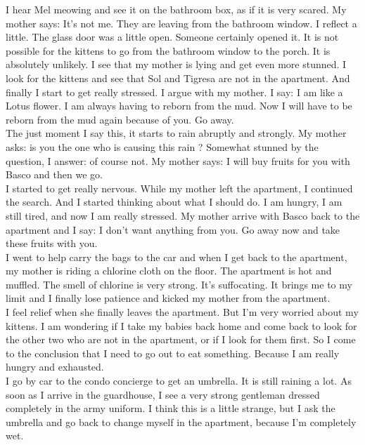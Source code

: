 \documentclass[11pt]{book}
\begin{document}
\noindent I hear Mel meowing and see it on the bathroom box, as if it is very scared. My mother says: It's not me. They are leaving from the bathroom window. I reflect a little. The glass door was a little open. Someone certainly opened it. It is not possible for the kittens to go from the bathroom window to the porch. It is absolutely unlikely. I see that my mother is lying and get even more stunned. I look for the kittens and see that Sol and Tigresa are not in the apartment. And finally I start to get really stressed. I argue with my mother. I say: I am like a Lotus flower. I am always having to reborn from the mud. Now I will have to be reborn from the mud again because of you. Go away. \\

\noindent The just moment I say this, it starts to rain abruptly and strongly. My mother asks: is you the one who is causing this rain ? Somewhat stunned by the question, I answer: of course not. My mother says: I will buy fruits for you with Basco and then we go. \\

\noindent I started to get really nervous. While my mother left the apartment, I continued the search. And I started thinking about what I should do. I am hungry, I am still tired, and now I am really stressed. My mother arrive with Basco back to the apartment and I say: I don't want anything from you. Go away now and take these fruits with you. \\

\noindent I went to help carry the bags to the car and when I get back to the apartment, my mother is riding a chlorine cloth on the floor. The apartment is hot and muffled. The smell of chlorine is very strong. It's suffocating. It brings me to my limit and I finally lose patience and kicked my mother from the apartment. \\

\noindent I feel relief when she finally leaves the apartment. But I'm very worried about my kittens. I am wondering if I take my babies back home and come back to look for the other two who are not in the apartment, or if I look for them first. So I come to the conclusion that I need to go out to eat something. Because I am really hungry and exhausted. \\

\noindent I go by car to the condo concierge to get an umbrella. It is still raining a lot. As soon as I arrive in the guardhouse, I see a very strong gentleman dressed completely in the army uniform. I think this is a little strange, but I ask the umbrella and go back to change myself in the apartment, because I'm completely wet. \\
\end{document}

